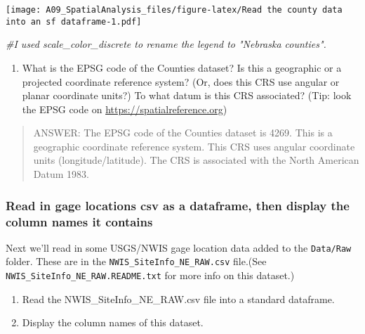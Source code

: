 \documentclass[
]{article}
\newenvironment{Shaded}{\begin{snugshade}}{\end{snugshade}}
\newcommand{\CommentTok}[1]{\textcolor[rgb]{0.56,0.35,0.01}{\textit{#1}}}
\providecommand{\tightlist}{%
  \setlength{\itemsep}{0pt}\setlength{\parskip}{0pt}}
\begin{document}
\texttt{[image: A09\_SpatialAnalysis\_files/figure-latex/Read the county data into an sf dataframe-1.pdf]}

\begin{Shaded}
\begin{Highlighting}[]
\CommentTok{\#I used scale\_color\_discrete to rename the legend to "Nebraska counties".}
\end{Highlighting}
\end{Shaded}

\begin{enumerate}
\def\labelenumi{\arabic{enumi}.}
\setcounter{enumi}{5}
\tightlist
\item
  What is the EPSG code of the Counties dataset? Is this a geographic or
  a projected coordinate reference system? (Or, does this CRS use
  angular or planar coordinate units?) To what datum is this CRS
  associated? (Tip: look the EPSG code on
  \url{https://spatialreference.org})
\end{enumerate}

\begin{quote}
ANSWER: The EPSG code of the Counties dataset is 4269. This is a
geographic coordinate reference system. This CRS uses angular coordinate
units (longitude/latitude). The CRS is associated with the North
American Datum 1983.
\end{quote}

\hypertarget{read-in-gage-locations-csv-as-a-dataframe-then-display-the-column-names-it-contains}{%
\subsubsection{Read in gage locations csv as a dataframe, then display
the column names it
contains}\label{read-in-gage-locations-csv-as-a-dataframe-then-display-the-column-names-it-contains}}

Next we'll read in some USGS/NWIS gage location data added to the
\texttt{Data/Raw} folder. These are in the
\texttt{NWIS\_SiteInfo\_NE\_RAW.csv} file.(See
\texttt{NWIS\_SiteInfo\_NE\_RAW.README.txt} for more info on this
dataset.)

\begin{enumerate}
\def\labelenumi{\arabic{enumi}.}
\setcounter{enumi}{6}
\item
  Read the NWIS\_SiteInfo\_NE\_RAW.csv file into a standard dataframe.
\item
  Display the column names of this dataset.
\end{enumerate}
\end{document}

